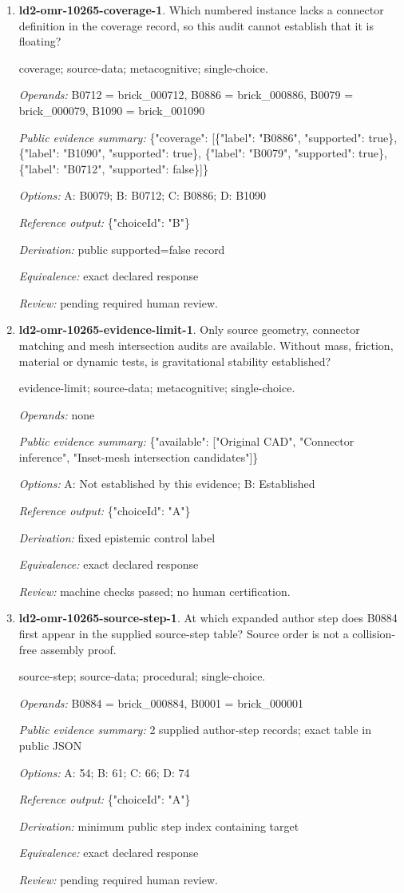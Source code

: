 \begin{enumerate}
\item \textbf{ld2-omr-10265-coverage-1}. Which numbered instance lacks a connector definition in the coverage record, so this audit cannot establish that it is floating?
\par{\small coverage; source-data; metacognitive; single-choice.\par\textit{Operands:} B0712 = brick\_000712, B0886 = brick\_000886, B0079 = brick\_000079, B1090 = brick\_001090\par\textit{Public evidence summary:} \{"coverage": [\{"label": "B0886", "supported": true\}, \{"label": "B1090", "supported": true\}, \{"label": "B0079", "supported": true\}, \{"label": "B0712", "supported": false\}]\}\par\textit{Options:} A: B0079; B: B0712; C: B0886; D: B1090\par\textit{Reference output:} \{"choiceId": "B"\}\par\textit{Derivation:} public supported=false record\par\textit{Equivalence:} exact declared response\par\textit{Review:} pending required human review.}
\item \textbf{ld2-omr-10265-evidence-limit-1}. Only source geometry, connector matching and mesh intersection audits are available. Without mass, friction, material or dynamic tests, is gravitational stability established?
\par{\small evidence-limit; source-data; metacognitive; single-choice.\par\textit{Operands:} none\par\textit{Public evidence summary:} \{"available": ["Original CAD", "Connector inference", "Inset-mesh intersection candidates"]\}\par\textit{Options:} A: Not established by this evidence; B: Established\par\textit{Reference output:} \{"choiceId": "A"\}\par\textit{Derivation:} fixed epistemic control label\par\textit{Equivalence:} exact declared response\par\textit{Review:} machine checks passed; no human certification.}
\item \textbf{ld2-omr-10265-source-step-1}. At which expanded author step does B0884 first appear in the supplied source-step table? Source order is not a collision-free assembly proof.
\par{\small source-step; source-data; procedural; single-choice.\par\textit{Operands:} B0884 = brick\_000884, B0001 = brick\_000001\par\textit{Public evidence summary:} 2 supplied author-step records; exact table in public JSON\par\textit{Options:} A: 54; B: 61; C: 66; D: 74\par\textit{Reference output:} \{"choiceId": "A"\}\par\textit{Derivation:} minimum public step index containing target\par\textit{Equivalence:} exact declared response\par\textit{Review:} pending required human review.}

\end{enumerate}
